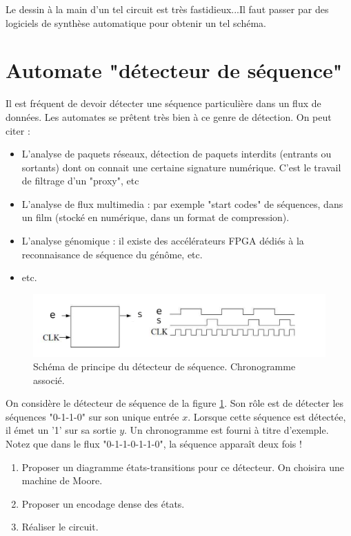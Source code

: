 \documentclass[a4paper,11pt]{article}
\begin{document}
Le dessin à la main d'un tel circuit est très fastidieux...Il faut passer par des logiciels de synthèse automatique pour obtenir
un tel schéma.


\section{Automate "détecteur de séquence"}

Il est fréquent de devoir détecter une séquence particulière dans un flux de données. Les automates se prêtent très bien à ce genre de détection. On peut citer :
\begin{itemize}
  \item L'analyse de paquets réseaux, détection de paquets interdits (entrants ou sortants) dont on connait une certaine signature numérique. C'est le travail de filtrage d'un "proxy", etc
  \item L'analyse de flux multimedia : par exemple "start codes" de séquences, dans un film (stocké en numérique, dans un format de compression).
  \item L'analyse génomique : il existe des accélérateurs FPGA dédiés à la reconnaisance de séquence du génôme, etc.
  \item etc.
\end{itemize}

\begin{figure}[!h]
  \begin{center}
    \includegraphics[scale=0.3]{./figures/exo2}
  \end{center}
  \caption{Schéma de principe du détecteur de séquence. Chronogramme associé.}
  \label{exo2}
\end{figure}

On considère le détecteur de séquence de la figure \ref{exo2}. Son rôle est de détecter les séquences "0-1-1-0" sur son unique entrée $x$.
Lorsque cette séquence est détectée, il émet un '1' sur sa sortie $y$. Un chronogramme est fourni à titre d'exemple. Notez que dans le flux
"0-1-1-0-1-1-0", la séquence apparaît deux fois !
\begin{enumerate}
  \item Proposer un diagramme états-transitions pour ce détecteur. On choisira une machine de Moore.
  \item Proposer un encodage dense des états.
  \item Réaliser le circuit.
\end{enumerate}
\end{document}
